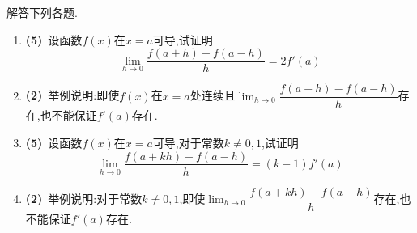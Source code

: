 \documentclass{ctexart}
\begin{document}
\begin{problem}
    解答下列各题.
    \begin{enumerate}[label=\textbf{(\arabic*)}]
        \item \textbf{(5)}\ 设函数$f(x)$在$x=a$可导,试证明$$\lim_{h\to0}\dfrac{f(a+h)-f(a-h)}{h}=2f'(a)$$
        \item \textbf{(2)}\ 举例说明:即使$f(x)$在$x=a$处连续且$\displaystyle\lim_{h\to0}\dfrac{f(a+h)-f(a-h)}{h}$存在,也不能保证$f'(a)$存在.
        \item \textbf{(5)}\ 设函数$f(x)$在$x=a$可导,对于常数$k\neq0,1$,试证明$$\lim_{h\to0}\dfrac{f(a+kh)-f(a-h)}{h}=(k-1)f'(a)$$
        \item \textbf{(2)}\ 举例说明:对于常数$k\neq0,1$,即使$\displaystyle\lim_{h\to0}\dfrac{f(a+kh)-f(a-h)}{h}$存在,也不能保证$f'(a)$存在.
    \end{enumerate}
\end{problem}
\end{document}
